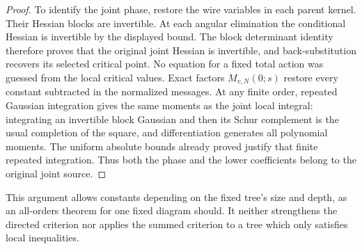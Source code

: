 \begin{proof}
To identify the joint phase, restore the wire variables in each
parent kernel. Their Hessian blocks are invertible. At each angular
elimination the conditional Hessian is invertible by the displayed
bound. The block determinant identity therefore proves that the
original joint Hessian is invertible, and back-substitution recovers
its selected critical point. No equation for a fixed total action
was guessed from the local critical values. Exact factors
$M_{v,N}(0;s)$ restore every constant subtracted in the normalized
messages. At any finite order, repeated Gaussian integration gives
the same moments as the joint local integral: integrating an
invertible block Gaussian and then its Schur complement is the
usual completion of the square, and differentiation generates all
polynomial moments. The uniform absolute bounds already proved
justify that finite repeated integration. Thus both the phase and
the lower coefficients belong to the original joint source.
\end{proof}

This argument allows constants depending on the fixed tree's size
and depth, as an all-orders theorem for one fixed diagram should.
It neither strengthens the directed criterion nor applies the
summed criterion to a tree which only satisfies local inequalities.
